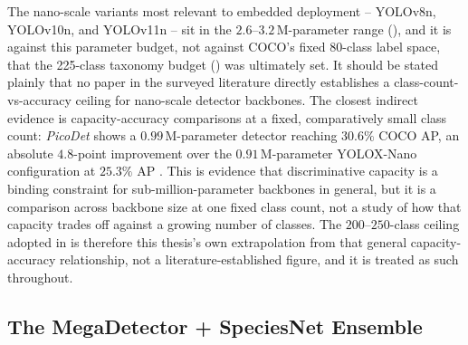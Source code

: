 The nano-scale variants most relevant to embedded deployment -- YOLOv8n, YOLOv10n, and YOLOv11n -- sit in the $2.6$--$3.2\,\mathrm{M}$-parameter range (), and it is against this parameter budget, not against COCO's fixed $80$-class label space, that the 225-class taxonomy budget () was ultimately set. It should be stated plainly that no paper in the surveyed literature directly establishes a class-count-vs-accuracy ceiling for nano-scale detector backbones. The closest indirect evidence is capacity-accuracy comparisons at a fixed, comparatively small class count: \textit{PicoDet} shows a $0.99\,\mathrm{M}$-parameter detector reaching $30.6\%$ COCO AP, an absolute $4.8$-point improvement over the $0.91\,\mathrm{M}$-parameter YOLOX-Nano configuration at $25.3\%$ AP \cite{yuPPPicoDetBetterRealTime2021,geYOLOXExceedingYOLO2021}. This is evidence that discriminative capacity is a binding constraint for sub-million-parameter backbones in general, but it is a comparison across backbone size at one fixed class count, not a study of how that capacity trades off against a growing number of classes. The $200$--$250$-class ceiling adopted in  is therefore this thesis's own extrapolation from that general capacity-accuracy relationship, not a literature-established figure, and it is treated as such throughout.

\subsection{The MegaDetector + SpeciesNet Ensemble}\label{sec:lit_md_speciesnet}

